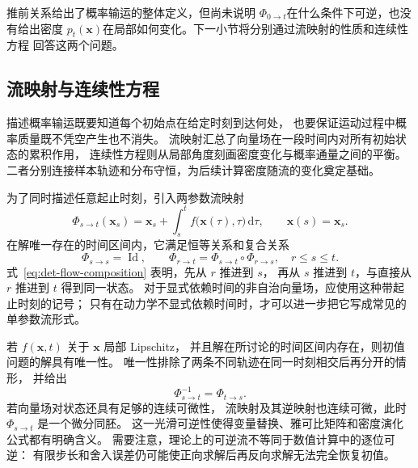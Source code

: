 \documentclass[UTF8,a4paper,zihao=-4,oneside,openany]{ctexbook}
\begin{document}
推前关系给出了概率输运的整体定义，但尚未说明
$\Phi_{0\to t}$在什么条件下可逆，也没有给出密度
$p_t(\mathbf{x})$在局部如何变化。下一小节将分别通过流映射的性质和连续性方程
回答这两个问题。

\subsection{流映射与连续性方程}

描述概率输运既要知道每个初始点在给定时刻到达何处，
也要保证运动过程中概率质量既不凭空产生也不消失。
流映射汇总了向量场在一段时间内对所有初始状态的累积作用，
连续性方程则从局部角度刻画密度变化与概率通量之间的平衡。
二者分别连接样本轨迹和分布守恒，为后续计算密度随流的变化奠定基础。

为了同时描述任意起止时刻，引入两参数流映射
\begin{equation}
    \Phi_{s\to t}(\mathbf{x}_s)
    =
    \mathbf{x}_s
    +
    \int_s^t
    f\bigl(\mathbf{x}(\tau),\tau\bigr)\,\mathrm{d}\tau,
    \qquad
    \mathbf{x}(s)=\mathbf{x}_s.
    \label{eq:det-two-time-flow}
\end{equation}
在解唯一存在的时间区间内，它满足恒等关系和复合关系
\begin{equation}
    \Phi_{s\to s}=\operatorname{Id},
    \qquad
    \Phi_{r\to t}
    =
    \Phi_{s\to t}\circ\Phi_{r\to s},
    \quad r\leq s\leq t.
    \label{eq:det-flow-composition}
\end{equation}
式~\eqref{eq:det-flow-composition} 表明，先从 \(r\) 推进到 \(s\)，
再从 \(s\) 推进到 \(t\)，与直接从 \(r\) 推进到 \(t\) 得到同一状态。
对于显式依赖时间的非自治向量场，应使用这种带起止时刻的记号；
只有在动力学不显式依赖时间时，才可以进一步把它写成常见的单参数流形式。

若 \(f(\mathbf{x},t)\) 关于 \(\mathbf{x}\) 局部 Lipschitz，
并且解在所讨论的时间区间内存在，则初值问题的解具有唯一性。
唯一性排除了两条不同轨迹在同一时刻相交后再分开的情形，
并给出
\begin{equation}
    \Phi_{s\to t}^{-1}
    =
    \Phi_{t\to s}.
    \label{eq:det-flow-inverse}
\end{equation}
若向量场对状态还具有足够的连续可微性，
流映射及其逆映射也连续可微，此时
\(\Phi_{s\to t}\) 是一个微分同胚。
这一光滑可逆性使得变量替换、雅可比矩阵和密度演化公式都有明确含义。
需要注意，理论上的可逆流不等同于数值计算中的逐位可逆：
有限步长和舍入误差仍可能使正向求解后再反向求解无法完全恢复初值。
\end{document}

